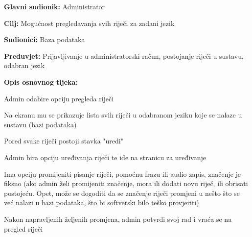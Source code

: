 \noindent {}
\begin{packed_item}

	\item \textbf{Glavni sudionik: } Administrator
	\item \textbf{Cilj: } Mogućnost pregledavanja svih riječi za zadani jezik
	\item \textbf{Sudionici: } Baza podataka
	\item \textbf{Preduvjet: } Prijavljivanje u administratorski račun, postojanje riječi u sustavu, odabran jezik
	\item  \textbf{Opis osnovnog tijeka:}
	
	\item[] \begin{packed_enum}
		
		\item Admin odabire opciju pregleda riječi
		\item Na ekranu mu se prikazuje lista svih riječi u odabranom jeziku koje se nalaze u sustavu (bazi podataka)
		\item Pored svake riječi postoji stavka "uredi"
		\item Admin bira opciju uređivanja riječi te ide na stranicu za uređivanje
		\item Ima opciju promijeniti pisanje riječi, pomoćnu frazu ili audio zapis, značenje je fiksno (ako admin želi promijeniti značenje, mora ili dodati novu riječ, ili obrisati postojeću. Opet, može se dogoditi da se značenje riječi promjeni u nešto što se već nalazi u bazi podataka, što bi softverski bilo teško provjeriti)
		\item Nakon napravljenih željenih promjena, admin potvrdi svoj rad i vraća se na pregled riječi

	\end{packed_enum}
	
\end{packed_item}



